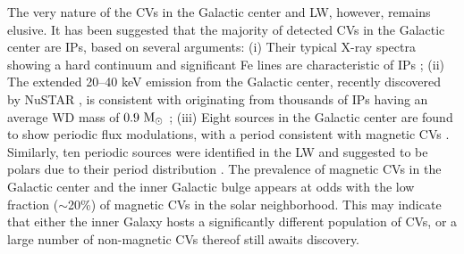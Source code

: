 \documentclass[fleqn,usenatbib]{mnras}
\begin{document}

The very nature of the CVs in the Galactic center and LW, however, remains elusive. 
It has been suggested that the majority of detected CVs in the Galactic center are IPs, based on several arguments: (i) Their typical X-ray spectra showing a hard continuum and significant Fe lines are characteristic of IPs \citep{2004ApJ...613.1179M,2009ApJS..181..110M}; (ii) The extended 20–40 keV emission from the Galactic center, recently discovered by NuSTAR \citep{2015Natur.520..646P}, is consistent with originating from thousands of IPs having an average WD mass of $0.9\rm~M_\odot$ 
\citep{2016ApJ...826..160H};
(iii) Eight sources in the Galactic center are found to show periodic flux modulations, with a period consistent with magnetic CVs \citep{2003ApJ...599..465M}. 
Similarly, ten periodic sources were identified in the LW and suggested to be 
polars due to their period distribution \citep{2012ApJ...746..165H}. 
The prevalence of magnetic CVs in the Galactic center and the inner Galactic bulge appears at odds with the low fraction ($\sim$20\%) of magnetic CVs in the solar neighborhood. This may indicate that either the inner Galaxy hosts a significantly different population of CVs, or a large number of non-magnetic CVs thereof still awaits discovery.

\end{document}
